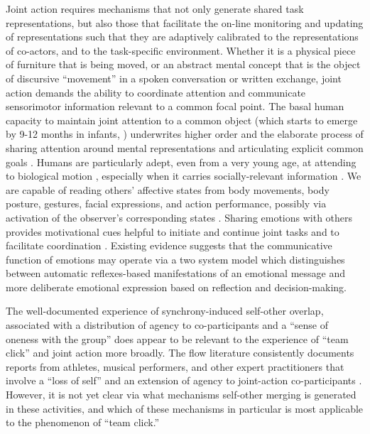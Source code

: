 \begin{CJK}{UTF8}{gbsn}
{Joint action requires mechanisms that not only generate shared task representations, but also those that facilitate the on-line monitoring and updating of representations such that they are adaptively calibrated to the representations of co-actors, and to the task-specific environment.  Whether it is a physical piece of furniture that is being moved, or an abstract mental concept that is the object of discursive ``movement'' in a spoken conversation or written exchange, joint action demands the ability to coordinate attention and communicate sensorimotor information relevant to a common focal point.  The basal human capacity to maintain joint attention to a common object (which starts to emerge by 9-12 months in infants, \cite[see]{Carpenter2013}) underwrites higher order and the elaborate process of sharing attention around mental representations and articulating explicit common goals \citep{Tomasello2014}.
Humans are particularly adept, even from a very young age, at attending to biological motion \citep{Scholl2000}, especially when it carries socially-relevant information \citep{Kozlowski1977,Cutting1977,Dittrich1996}.
We are capable of reading others' affective states from body movements, body posture, gestures, facial expressions, and action performance, possibly via activation of the observer's corresponding states \citep{Bastiaansen2009,Borgomaneri2012}. Sharing emotions with others provides motivational cues helpful to initiate and continue joint tasks and to facilitate coordination \citep{Michael2016}. Existing evidence suggests that the communicative function of emotions may operate via a two system model which distinguishes between automatic reflexes-based manifestations of an emotional message and more deliberate emotional expression based on reflection and decision-making\citep{DeGelder2006}.

The well-documented experience of synchrony-induced self-other overlap, associated with a distribution of agency to co-participants and a ``sense of oneness with the group'' \citep{Swann2012} does appear to be relevant to the experience of ``team click'' and joint action more broadly.  The flow literature consistently documents reports from athletes, musical performers, and other expert practitioners that involve a ``loss of self'' and an extension of agency to joint-action co-participants \citep{Jackson1995,Jackson1999}.  However, it is not yet clear via what mechanisms self-other merging is generated in these activities, and which of these mechanisms in particular is most applicable to the phenomenon of ``team click.''

}
\end{CJK}
